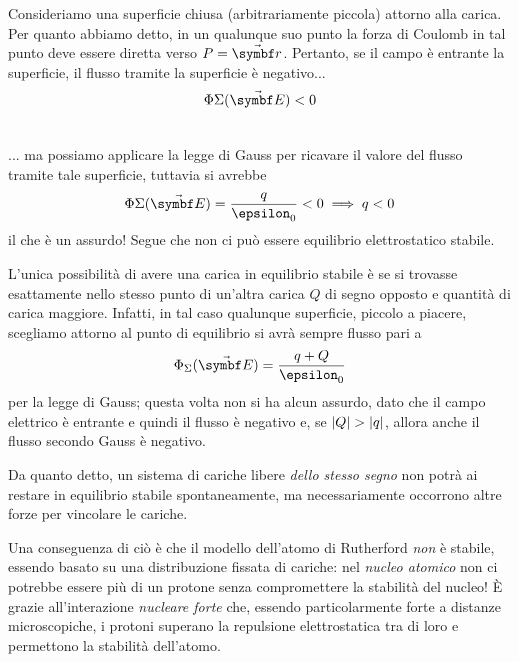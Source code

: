 \begin{demonstration}
\begin{enumerate}
\begin{minipage}{0.54\textwidth}
			Consideriamo una superficie chiusa (arbitrariamente piccola) attorno alla carica.
			Per quanto abbiamo detto, in un qualunque suo punto la forza di Coulomb in tal punto deve essere diretta verso $P=\vba{r}$. Pertanto, se il campo è entrante la superficie, il flusso tramite la superficie è negativo...
			\begin{equation}
				\Phi{\Sigma}(\vba{E})<0
			\end{equation}
		\end{minipage}\\
		... ma possiamo applicare la legge di Gauss per ricavare il valore del flusso tramite tale superficie, tuttavia si avrebbe
		\begin{equation*}
			\Phi{\Sigma}(\vba{E})=\frac{q}{\epsilon_0}<0\implies q<0
		\end{equation*}
		il che è un assurdo! Segue che non ci può essere equilibrio elettrostatico stabile.\qedhere
	\end{enumerate}
\end{demonstration}
L'unica possibilità di avere una carica in equilibrio stabile è se si trovasse esattamente nello stesso punto di un'altra carica $Q$ di segno opposto e quantità di carica maggiore. Infatti, in tal caso qualunque superficie, piccolo a piacere, scegliamo attorno al punto di equilibrio si avrà sempre flusso pari a
\begin{equation*}
	\Phi_{\Sigma}(\vba{E})=\frac{q+Q}{\epsilon_0}
\end{equation*}
per la legge di Gauss; questa volta non si ha alcun assurdo, dato che il campo elettrico è entrante e quindi il flusso è negativo e, se $\abs{Q}>\abs{q}$, allora anche il flusso secondo Gauss è negativo.
\begin{digression}
	Da quanto detto, un sistema di cariche libere \textit{dello stesso segno} non potrà ai restare in equilibrio stabile spontaneamente, ma necessariamente occorrono altre forze per vincolare le cariche.
	
	Una conseguenza di ciò è che il modello dell'atomo di Rutherford \textit{non} è stabile, essendo basato su una distribuzione fissata di cariche: nel \textit{nucleo atomico} non ci potrebbe essere più di un protone senza compromettere la stabilità del nucleo! È grazie all'interazione \textit{nucleare forte} che, essendo particolarmente forte a distanze microscopiche, i protoni superano la repulsione elettrostatica tra di loro e permettono la stabilità dell'atomo.
\end{digression}